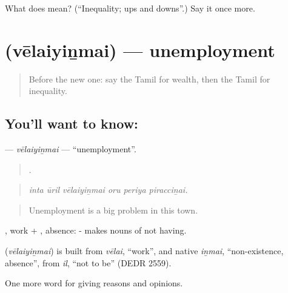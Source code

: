 \begin{tcolorbox}[breakable,colback=teal!4,colframe=teal!35!black,title={Before you move on}]
What does  mean? (\textquotedblleft{}Inequality; ups and downs\textquotedblright{}.) Say it once more.
\end{tcolorbox}
\section[\texorpdfstring{\ta{வேலையின்மை} (vēlaiyiṉmai)}{வேலையின்மை (vēlaiyiṉmai)}]{ (vēlaiyiṉmai) — unemployment}

\label{lesson:TA-C370-velaiyinmai}



\begin{quote}
Before the new one: say the Tamil for wealth, then the Tamil for inequality.
\end{quote}

\subsection*{You'll want to know: }
\textbf{} — \emph{vēlaiyiṉmai} — \textquotedblleft{}unemployment\textquotedblright{}.

\begin{quote}
     .
\end{quote}

\begin{quote}
\emph{inta ūril vēlaiyiṉmai oru periya piracciṉai.}
\end{quote}

\begin{quote}
Unemployment is a big problem in this town.
\end{quote}

, work + , absence: - makes nouns of not having.

\begin{cousinweb}
\textbf{} (\emph{vēlaiyiṉmai}) is built from \emph{vēlai}, \textquotedblleft{}work\textquotedblright{}, and native \emph{iṉmai}, \textquotedblleft{}non-existence, absence\textquotedblright{}, from \emph{il}, \textquotedblleft{}not to be\textquotedblright{} (DEDR 2559).
\end{cousinweb}

\begin{grammarlens}[title={What you've built}]
One more word for giving reasons and opinions.
\end{grammarlens}

